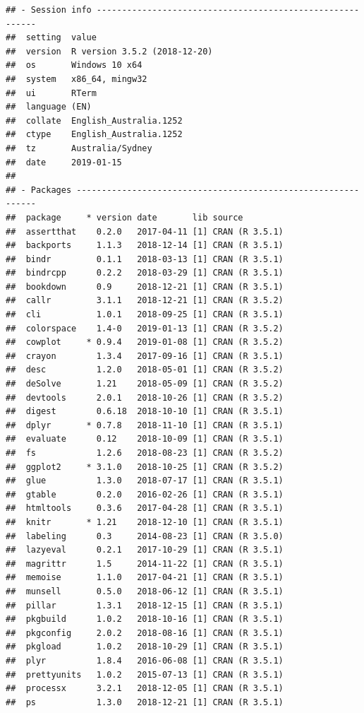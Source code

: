 \documentclass[]{elsarticle} %
\begin{document}
\begin{verbatim}
## - Session info ----------------------------------------------------------
##  setting  value                       
##  version  R version 3.5.2 (2018-12-20)
##  os       Windows 10 x64              
##  system   x86_64, mingw32             
##  ui       RTerm                       
##  language (EN)                        
##  collate  English_Australia.1252      
##  ctype    English_Australia.1252      
##  tz       Australia/Sydney            
##  date     2019-01-15                  
## 
## - Packages --------------------------------------------------------------
##  package     * version date       lib source        
##  assertthat    0.2.0   2017-04-11 [1] CRAN (R 3.5.1)
##  backports     1.1.3   2018-12-14 [1] CRAN (R 3.5.1)
##  bindr         0.1.1   2018-03-13 [1] CRAN (R 3.5.1)
##  bindrcpp      0.2.2   2018-03-29 [1] CRAN (R 3.5.1)
##  bookdown      0.9     2018-12-21 [1] CRAN (R 3.5.1)
##  callr         3.1.1   2018-12-21 [1] CRAN (R 3.5.2)
##  cli           1.0.1   2018-09-25 [1] CRAN (R 3.5.1)
##  colorspace    1.4-0   2019-01-13 [1] CRAN (R 3.5.2)
##  cowplot     * 0.9.4   2019-01-08 [1] CRAN (R 3.5.2)
##  crayon        1.3.4   2017-09-16 [1] CRAN (R 3.5.1)
##  desc          1.2.0   2018-05-01 [1] CRAN (R 3.5.2)
##  deSolve       1.21    2018-05-09 [1] CRAN (R 3.5.2)
##  devtools      2.0.1   2018-10-26 [1] CRAN (R 3.5.2)
##  digest        0.6.18  2018-10-10 [1] CRAN (R 3.5.1)
##  dplyr       * 0.7.8   2018-11-10 [1] CRAN (R 3.5.1)
##  evaluate      0.12    2018-10-09 [1] CRAN (R 3.5.1)
##  fs            1.2.6   2018-08-23 [1] CRAN (R 3.5.2)
##  ggplot2     * 3.1.0   2018-10-25 [1] CRAN (R 3.5.2)
##  glue          1.3.0   2018-07-17 [1] CRAN (R 3.5.1)
##  gtable        0.2.0   2016-02-26 [1] CRAN (R 3.5.1)
##  htmltools     0.3.6   2017-04-28 [1] CRAN (R 3.5.1)
##  knitr       * 1.21    2018-12-10 [1] CRAN (R 3.5.1)
##  labeling      0.3     2014-08-23 [1] CRAN (R 3.5.0)
##  lazyeval      0.2.1   2017-10-29 [1] CRAN (R 3.5.1)
##  magrittr      1.5     2014-11-22 [1] CRAN (R 3.5.1)
##  memoise       1.1.0   2017-04-21 [1] CRAN (R 3.5.1)
##  munsell       0.5.0   2018-06-12 [1] CRAN (R 3.5.1)
##  pillar        1.3.1   2018-12-15 [1] CRAN (R 3.5.1)
##  pkgbuild      1.0.2   2018-10-16 [1] CRAN (R 3.5.1)
##  pkgconfig     2.0.2   2018-08-16 [1] CRAN (R 3.5.1)
##  pkgload       1.0.2   2018-10-29 [1] CRAN (R 3.5.1)
##  plyr          1.8.4   2016-06-08 [1] CRAN (R 3.5.1)
##  prettyunits   1.0.2   2015-07-13 [1] CRAN (R 3.5.1)
##  processx      3.2.1   2018-12-05 [1] CRAN (R 3.5.1)
##  ps            1.3.0   2018-12-21 [1] CRAN (R 3.5.1)

\end{verbatim}
\end{document}
